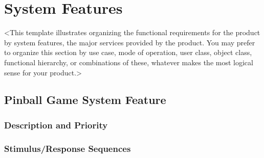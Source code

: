 \documentclass[11pt]{article}
\begin{document}
\section{System Features}
\label{sec:org4af94b1}
<This template illustrates organizing the functional requirements for the product by system
features, the major services provided by the product. You may prefer to organize this section by
use case, mode of operation, user class, object class, functional hierarchy, or combinations of
these, whatever makes the most logical sense for your product.>
\subsection{Pinball Game System Feature}
\label{sec:org98a5326}
\subsubsection{Description and Priority}
\label{sec:orgec63648}
\subsubsection{Stimulus/Response Sequences}
\label{sec:org93b0be6}
\end{document}

